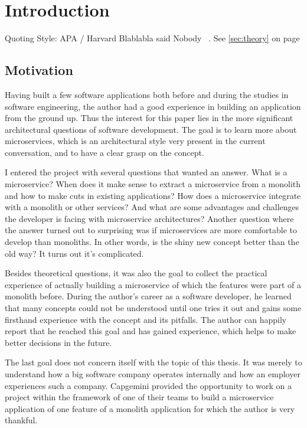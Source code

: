 \chapter{Introduction}
\label{sec:intro}

Quoting Style: APA / Harvard
Blablabla said Nobody ~\cite{melzer.2010}.
See \ref{sec:theory} on page \pageref{sec:theory}

\section{Motivation}
\label{sec:intro-motivation}

Having built a few software applications both before and during the studies in software engineering, the author had a good experience in building an application from the ground up. Thus the interest for this paper lies in the more significant architectural questions of software development. The goal is to learn more about microservices, which is an architectural style very present in the current conversation, and to have a clear grasp on the concept.

I entered the project with several questions that wanted an answer. What is a microservice? When does it make sense to extract a microservice from a monolith and how to make cuts in existing applications? How does a microservice integrate with a monolith or other services? And what are some advantages and challenges the developer is facing with microservice architectures? Another question where the answer turned out to surprising was if microservices are more comfortable to develop than monoliths. In other words, is the shiny new concept better than the old way? It turns out it's complicated.

Besides theoretical questions, it was also the goal to collect the practical experience of actually building a microservice of which the features were part of a monolith before. During the author's career as a software developer, he learned that many concepts could not be understood until one tries it out and gains some firsthand experience with the concept and its pitfalls. The author can happily report that he reached this goal and has gained experience, which helps to make better decisions in the future.

The last goal does not concern itself with the topic of this thesis. It was merely to understand how a big software company operates internally and how an employer experiences such a company. Capgemini provided the opportunity to work on a project within the framework of one of their teams to build a microservice application of one feature of a monolith application for which the author is very thankful.


